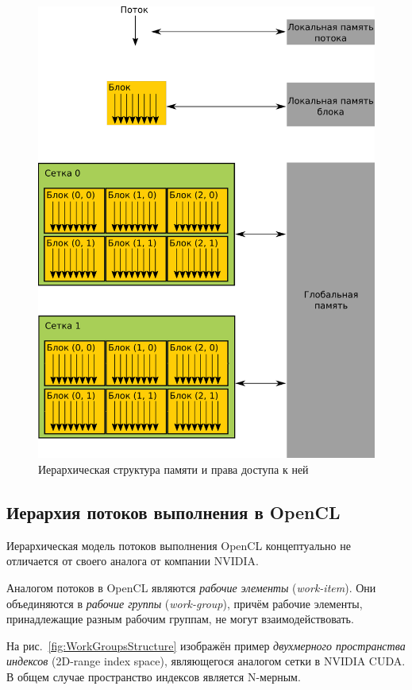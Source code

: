 \begin{figure}[p]
\centering
\includegraphics[width=1\textwidth]{include/graphics/image3}
\caption{Иерархическая структура памяти и права доступа к ней}
\label{fig:MemoryStructure}
\end{figure}

\subsection{Иерархия потоков выполнения в OpenCL}

Иерархическая модель потоков выполнения OpenCL концептуально не отличается от 
своего аналога от компании NVIDIA.

Аналогом потоков в OpenCL являются \emph{рабочие элементы} (\emph{work-item}). Они объединяются в \emph{рабочие группы} (\emph{work-group}), причём рабочие элементы, принадлежащие разным рабочим группам, не могут взаимодействовать.

На рис.~\ref{fig:WorkGroupsStructure} изображён пример \textit{двухмерного пространства индексов} (2D-range index space), являющегося аналогом сетки в NVIDIA CUDA. В общем случае пространство индексов является N-мерным.

